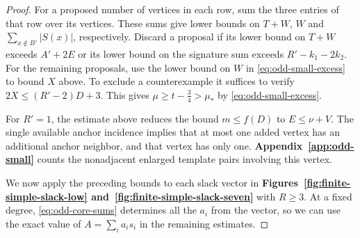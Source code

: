 \documentclass[preprint,11pt,numbers]{elsarticle-arxiv}
\numberwithin{equation}{section}
\theoremstyle{definition}
\begin{document}
\begin{proof}
For a proposed number of vertices in each row, sum the three
entries of that row over its vertices. These sums give lower
bounds on $T+W$, $W$ and $\sum_{x\notin B'}|S(x)|$,
respectively. Discard a proposal if its lower bound on $T+W$
exceeds $A'+2E$ or its lower bound on the signature sum exceeds
$R'-k_1-2k_2$. For the remaining proposals, use the lower
bound on $W$ in \eqref{eq:odd-small-excess} to bound $X$ above.
To exclude a counterexample it suffices to verify
$2X\leq(R'-2)D+3$. This gives
$\mu\geq t-\frac{3}{4}>\mu_*$ by \eqref{eq:odd-small-excess}.

For $R'=1$, the estimate above reduces the bound $m\leq f(D)$ to
$E\leq\nu+V$. The single available anchor incidence implies that
at most one added vertex has an additional anchor neighbor,
and that vertex has only one. \textbf{Appendix~\ref{app:odd-small}}
counts the nonadjacent enlarged template pairs involving this
vertex.

We now apply the preceding bounds to each slack vector in
\textbf{Figures~\ref{fig:finite-simple-slack-low}
and~\ref{fig:finite-simple-slack-seven}} with $R\geq3$.
At a fixed degree, \eqref{eq:odd-core-sums} determines all the
$a_i$ from the vector, so we can use the exact value of
$A=\sum_i a_is_i$ in the remaining estimates.


\end{proof}
\end{document}
